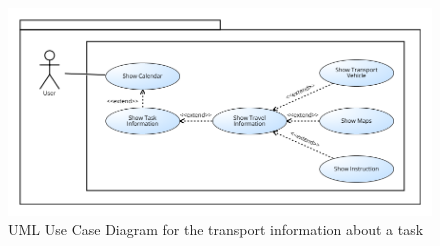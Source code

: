 \begin{figure}[H]
\centering
\includegraphics[scale=0.5]{Pictures/UseCaseDiagram/Transport_Instruction.png}
\caption{UML Use Case Diagram for the transport information about a task}
\end{figure}